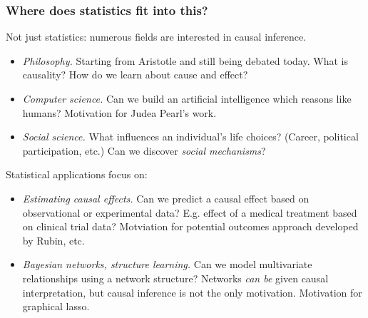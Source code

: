 \documentclass{beamer}
\begin{document}
\begin{frame}
\frametitle{Where does statistics fit into this?}
Not just statistics: numerous fields are interested in causal inference.
\begin{itemize}
\item \emph{Philosophy.} Starting from Aristotle and still being debated today.  What is causality?  How do we learn about cause and effect?
\item \emph{Computer science.}  Can we build an artificial intelligence which reasons like humans?  Motivation for Judea Pearl's work.
\item \emph{Social science.}  What influences an individual's life choices? (Career, political participation, etc.)  Can we discover \emph{social mechanisms}?
\end{itemize}

Statistical applications focus on:
\begin{itemize}
\item \emph{Estimating causal effects.} Can we predict a causal effect based on observational or experimental data? 
E.g. effect of a medical treatment based on clinical trial data?
Motviation for potential outcomes approach developed by Rubin, etc.
\item \emph{Bayesian networks, structure learning.} Can we model multivariate relationships using a network structure?
Networks \emph{can be} given causal interpretation, but causal inference is not the only motivation.
Motivation for graphical lasso.
\end{itemize}
\end{frame}
\end{document}
